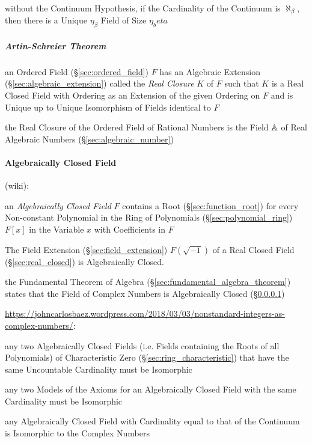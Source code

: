 without the Continuum Hypothesis, if the Cardinality of the Continuum is
$\aleph_\beta$, then there is a Unique $\eta_\beta$ Field of Size $\eta_beta$



\subparagraph{Artin-Schreier Theorem}\label{sec:artin_schreier}\hfill

an Ordered Field (\S\ref{sec:ordered_field}) $F$ has an Algebraic Extension
(\S\ref{sec:algebraic_extension}) called the \emph{Real Closure} $K$ of $F$
such that $K$ is a Real Closed Field with Ordering as an Extension of the given
Ordering on $F$ and is Unique up to Unique Isomorphism of Fields identical to
$F$

the Real Closure of the Ordered Field of Rational Numbers is the Field
$\mathbb{A}$ of Real Algebraic Numbers (\S\ref{sec:algebraic_number})



\paragraph{Algebraically Closed Field}\label{sec:algebraically_closed}
\hfill

(wiki):

an \emph{Algebraically Closed Field} $F$ contains a Root
(\S\ref{sec:function_root}) for every Non-constant Polynomial in the Ring of
Polynomials (\S\ref{sec:polynomial_ring}) $F[x]$ in the Variable $x$ with
Coefficients in $F$

The Field Extension (\S\ref{sec:field_extension}) $F(\sqrt{-1})$ of a
Real Closed Field (\S\ref{sec:real_closed}) is Algebraically Closed.

the Fundamental Theorem of Algebra (\S\ref{sec:fundamental_algebra_theorem})
states that the Field of Complex Numbers is Algebraically Closed
(\S\ref{sec:algebraically_closed})

\url{https://johncarlosbaez.wordpress.com/2018/03/03/nonstandard-integers-as-complex-numbers/}:

any two Algebraically Closed Fields (i.e. Fields containing the Roots of all
Polynomials) of Characteristic Zero (\S\ref{sec:ring_characteristic}) that have
the same Uncountable Cardinality must be Isomorphic

any two Models of the Axioms for an Algebraically Closed Field with the same
Cardinality must be Isomorphic

any Algebraically Closed Field with Cardinality equal to that of the Continuum
is Isomorphic to the Complex Numbers



